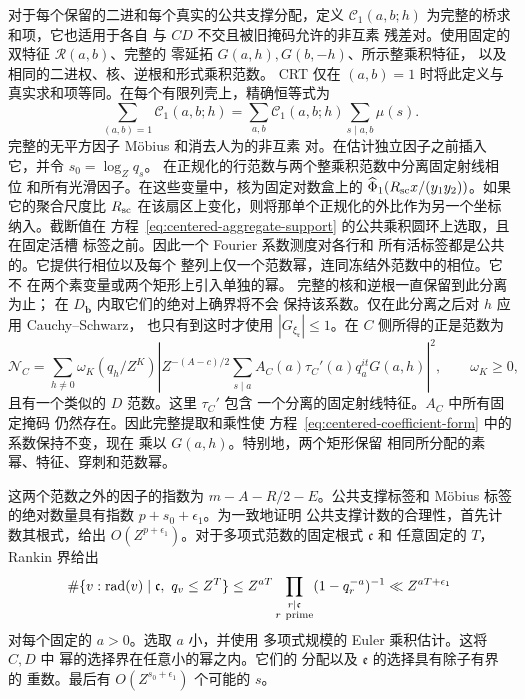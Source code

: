 对于每个保留的二进和每个真实的公共支撑分配，定义
\(\mathcal C_1(a,b;h)\) 为完整的桥求和项，它也适用于各自
与 \(CD\) 不交且被旧掩码允许的非互素
残差对。使用固定的双特征 \(\mathcal R(a,b)\)、完整的
零延拓 \(G(a,h),G(b,-h)\)、所示整乘积特征，
以及相同的二进权、核、逆根和形式乘积范数。
CRT 仅在 \((a,b)=1\) 时将此定义与
真实求和项等同。在每个有限列壳上，精确恒等式为
\[
 \sum_{(a,b)=1}\mathcal C_1(a,b;h)
 =\sum_{a,b}\mathcal C_1(a,b;h)\sum_{s\mid a,b}\mu(s).
\]
完整的无平方因子 M\"obius 和消去人为的非互素
对。在估计独立因子之前插入它，并令
\(s_0=\log_Zq_s\)。
在正规化的行范数与两个整乘积范数中分离固定射线相位
和所有光滑因子。在这些变量中，核为固定对数盒上的
\(\widehat\Phi_1(R_{\rm sc}x/(y_1y_2))\)。如果它的聚合尺度比 \(R_{\rm sc}\)
在该扇区上变化，则将那单个正规化的外比作为另一个坐标
纳入。截断值在
方程~\eqref{eq:centered-aggregate-support} 的公共乘积圆环上选取，且在固定活槽
标签之前。因此一个 Fourier 系数测度对各行和
所有活标签都是公共的。它提供行相位以及每个
整列上仅一个范数幂，连同冻结外范数中的相位。它不
在两个素变量或两个矩形上引入单独的幂。
完整的核和逆根一直保留到此分离为止；
在 \(D_{\mathbf b}\) 内取它们的绝对上确界将不会
保持该系数。仅在此分离之后对 \(h\) 应用 Cauchy--Schwarz，
也只有到这时才使用 \(|G_{\xi_{\mathfrak r}}|\le1\)。在 \(C\) 侧所得的正是范数为
\[
 \mathcal N_C=
 \sum_{h\ne0}\omega_K(q_h/Z^K)
 \left|Z^{-(A-c)/2}
   \sum_{s\mid a}A_C(a)\tau_C'(a)q_a^{it}G(a,h)\right|^2,
 \qquad \omega_K\ge0,
\]
且有一个类似的 \(D\) 范数。这里 \(\tau_C'\) 包含
一个分离的固定射线特征。\(A_C\) 中所有固定掩码
仍然存在。因此完整提取和乘性使
方程~\eqref{eq:centered-coefficient-form} 中的系数保持不变，现在
乘以 \(G(a,h)\)。特别地，两个矩形保留
相同所分配的素幂、特征、穿刺和范数幂。

这两个范数之外的因子的指数为
\(m-A-R/2-E\)。公共支撑标签和
M\"obius 标签的绝对数量具有指数 \(p+s_0+\epsilon_1\)。为一致地证明
公共支撑计数的合理性，首先计数其根式，给出
\(O(Z^{p+\epsilon_1})\)。对于多项式范数的固定根式 \(\mathfrak c\) 和
任意固定的 \(T\)，Rankin 界给出
\[
 \#\{v:\operatorname{rad}(v)\mid\mathfrak c,\ q_v\le Z^T\}
 \le Z^{aT}\prod_{\substack{r\mid\mathfrak c\\r\ {\rm prime}}}
             (1-q_r^{-a})^{-1}
 \ll Z^{aT+\epsilon_1}
\]
对每个固定的 \(a>0\)。选取 \(a\) 小，并使用
多项式规模的 Euler 乘积估计。这将 \(C,D\) 中
幂的选择界在任意小的幂之内。它们的
分配以及 \(\mathfrak e\) 的选择具有除子有界的
重数。最后有 \(O(Z^{s_0+\epsilon_1})\)
个可能的 \(s\)。

